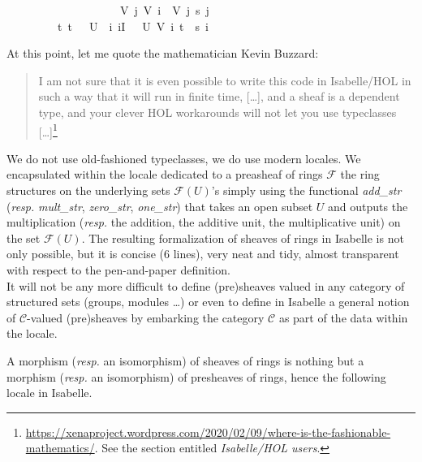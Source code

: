 \documentclass[12pt]{scrartcl}
\begin{document}
\begin{isabelle}
\ \ \ \ \ \ \ \ \ \ \ \ \ \ \ \ \ \ {\isacharequal}{\kern0pt}\ {\isasymrho}\ {\isacharparenleft}{\kern0pt}V\ j{\isacharparenright}{\kern0pt}\ {\isacharparenleft}{\kern0pt}V\ i\ {\isasyminter}\ V\ j{\isacharparenright}{\kern0pt}\ {\isacharparenleft}{\kern0pt}s\ j{\isacharparenright}{\kern0pt}{\isacharparenright}{\kern0pt}\ \isanewline
\ \ \ \ \ \ \ \ {\isasymLongrightarrow}\ {\isacharparenleft}{\kern0pt}{\isasymexists}t{\isachardot}{\kern0pt}\ t\ {\isasymin}\ {\isasymFF}\ U\ {\isasymand}\ {\isacharparenleft}{\kern0pt}{\isasymforall}i{\isachardot}{\kern0pt}\ i{\isasymin}I\ {\isasymlongrightarrow}\ {\isasymrho}\ U\ {\isacharparenleft}{\kern0pt}V\ i{\isacharparenright}{\kern0pt}\ t\ {\isacharequal}{\kern0pt}\ s\ i{\isacharparenright}{\kern0pt}{\isacharparenright}{\kern0pt}{\isachardoublequoteclose}
\end{isabelle}
 
At this point, let me quote the mathematician Kevin Buzzard:
\begin{quote}
	I am not sure that it is even possible to write this code in Isabelle/HOL in such a way that it will run in finite time, [\dots], and a sheaf is a dependent type, and your clever HOL workarounds will not let you use typeclasses [\dots]\footnote{\url{https://xenaproject.wordpress.com/2020/02/09/where-is-the-fashionable-mathematics/}. See the section entitled \textit{Isabelle/HOL users}.}
\end{quote}

We do not use old-fashioned typeclasses, we do use modern locales. We encapsulated within the locale dedicated to a preasheaf of rings $\mathscr{F}$ the ring structures on the underlying sets $\mathscr{F}(U)$'s simply using the functional \textit{add\_str} (\textit{resp.} \textit{mult\_str}, \textit{zero\_str}, \textit{one\_str}) that takes an open subset $U$ and outputs the multiplication (\textit{resp.} the addition, the additive unit, the multiplicative unit) on the set $\mathscr{F}(U)$. The resulting formalization of sheaves of rings in Isabelle is not only possible, but it is concise (6 lines), very neat and tidy, almost transparent with respect to the pen-and-paper definition. \\
It will not be any more difficult to define (pre)sheaves valued in any category of structured sets (groups, modules \dots) or even to define in Isabelle a general notion of $\mathscr{C}$-valued (pre)sheaves by embarking the category $\mathscr{C}$ as part of the data within the locale.  	


A morphism (\textit{resp.} an isomorphism) of sheaves of rings is nothing but a morphism (\textit{resp.} an isomorphism) of presheaves of rings, hence the following locale in Isabelle.
\end{document}

